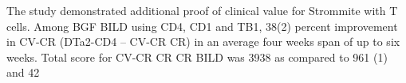 \documentclass{article}
\begin{document}
The study demonstrated additional proof of clinical value for Strommite with T cells. Among BGF BILD using CD4, CD1 and TB1, 38(2) percent improvement in CV-CR (DTa2-CD4 – CV-CR CR) in an average four weeks span of up to six weeks. Total score for CV-CR CR CR BILD was 3938 as compared to 961 (1) and 42%
\end{document}
